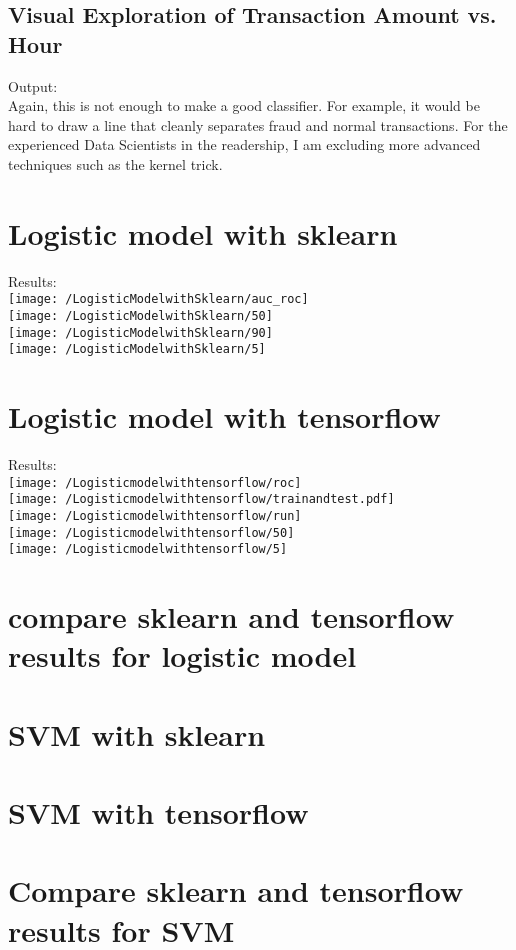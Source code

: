 \documentclass[17pt]{report}
\begin{document}
\subsection{Visual Exploration of Transaction Amount vs. Hour}

Output:\\
Again, this is not enough to make a good classifier. For example, it would be hard to draw a line that cleanly
separates fraud and normal transactions. For the experienced Data Scientists in the readership, I am excluding
more advanced techniques such as the kernel trick.\\
\section{Logistic model with sklearn}

Results:\\
\texttt{[image: /LogisticModelwithSklearn/auc\_roc]}\\
\texttt{[image: /LogisticModelwithSklearn/50]}\\
\texttt{[image: /LogisticModelwithSklearn/90]}\\
\texttt{[image: /LogisticModelwithSklearn/5]}
\section{Logistic model with tensorflow}

Results:\\
\texttt{[image: /Logisticmodelwithtensorflow/roc]}\\
\texttt{[image: /Logisticmodelwithtensorflow/trainandtest.pdf]}\\
\texttt{[image: /Logisticmodelwithtensorflow/run]}\\
\texttt{[image: /Logisticmodelwithtensorflow/50]}\\
\texttt{[image: /Logisticmodelwithtensorflow/5]}
\section{compare sklearn and tensorflow results for logistic model}

\section{SVM with sklearn}

\section{SVM with tensorflow}
	
\section{Compare sklearn and tensorflow results for SVM}
\end{document}
